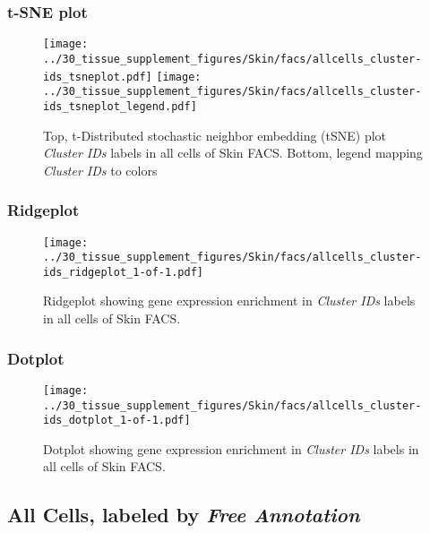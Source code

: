 \clearpage
\subsubsection{t-SNE plot}
\begin{figure}[h]
\centering
\texttt{[image: ../30\_tissue\_supplement\_figures/Skin/facs/allcells\_cluster-ids\_tsneplot.pdf]}
\texttt{[image: ../30\_tissue\_supplement\_figures/Skin/facs/allcells\_cluster-ids\_tsneplot\_legend.pdf]}
\caption{Top, t-Distributed stochastic neighbor embedding (tSNE) plot  \emph{Cluster IDs} labels in all cells of Skin FACS. Bottom, legend mapping \emph{Cluster IDs} to colors}
\end{figure}


\clearpage

\subsubsection{Ridgeplot}
\begin{figure}[h]
\centering
\texttt{[image: ../30\_tissue\_supplement\_figures/Skin/facs/allcells\_cluster-ids\_ridgeplot\_1-of-1.pdf]}

\caption{ Ridgeplot  showing gene expression enrichment in \emph{Cluster IDs} labels in all cells of Skin FACS. }
\end{figure}


\clearpage

\subsubsection{Dotplot}
\begin{figure}[h]
\centering
\texttt{[image: ../30\_tissue\_supplement\_figures/Skin/facs/allcells\_cluster-ids\_dotplot\_1-of-1.pdf]}

\caption{ Dotplot  showing gene expression enrichment in \emph{Cluster IDs} labels in all cells of Skin FACS. }
\end{figure}


\clearpage

\subsection{All Cells, labeled by \emph{Free Annotation}}

